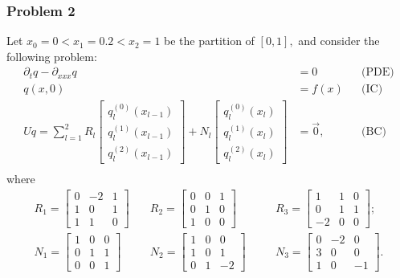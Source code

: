 \documentclass[11pt,reqno,oneside,a4paper]{article}
\theoremstyle{plain} %
\theoremstyle{definition}
\theoremstyle{remark}
\begin{document}
\subsubsection*{Problem 2}
Let $x_0 = 0 < x_1  = 0.2 < x_2 = 1$ be the partition of $[0,1],$ and consider the following problem:
\begin{align*}
\partial_t q - \partial_{xxx} q &= 0 &&\text{(PDE)} \\
q(x, 0) &= f(x) &&\text{(IC)} \\
Uq = \sum^2_{l=1} R_l \begin{bmatrix} q_l^{(0)}(x_{l-1}) \\ q_l^{(1)}(x_{l-1}) \\ q_l^{(2)}(x_{l-1})  \end{bmatrix} + N_l \begin{bmatrix} q_l^{(0)}(x_{l}) \\ q_l^{(1)}(x_{l}) \\ q_l^{(2)}(x_{l}) \end{bmatrix} &= \vec{0}, &&\text{(BC)} \\
\end{align*}
where 
\begin{equation*}
\begin{aligned}
R_1 = \begin{bmatrix} 0 & -2 & 1 \\ 1 & 0 & 1 \\ 1 & 1 & 0 \end{bmatrix} &\quad R_2= \begin{bmatrix} 0 & 0 & 1 \\ 0 & 1 & 0 \\ 1 & 0 & 0 \end{bmatrix} &&\quad R_3 = \begin{bmatrix} 1 & 1 & 0 \\ 0 & 1 & 1 \\ -2 & 0 & 0 \end{bmatrix}; \\
N_1 = \begin{bmatrix} 1 & 0 & 0 \\ 0 & 1 & 1 \\ 0 & 0 & 1 \end{bmatrix} &\quad N_2 = \begin{bmatrix} 1 & 0 & 0 \\ 1 & 0 & 1 \\ 0 & 1 & -2 \end{bmatrix} &&\quad N_3 = \begin{bmatrix} 0 & -2 & 0 \\ 3 & 0 & 0 \\ 1 & 0 & -1 \end{bmatrix}. 
\end{aligned}
\end{equation*}
\end{document}
